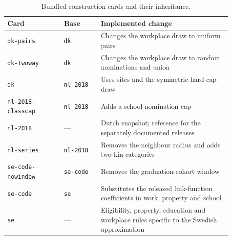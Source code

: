 \begin{table}[!htbp]
\centering\small
\caption{Bundled construction cards and their inheritance.}
\label{tab:cards}
\begin{tabular}{@{} >{\raggedright\arraybackslash}p{0.23\linewidth} >{\raggedright\arraybackslash}p{0.15\linewidth} >{\raggedright\arraybackslash}p{0.53\linewidth} @{}}
\toprule
\rowcolor{tableblue} \textbf{Card} & \textbf{Base} & \textbf{Implemented change} \\
\midrule
\texttt{dk-pairs} & \texttt{dk} & Changes the workplace draw to uniform pairs \\
\texttt{dk-twoway} & \texttt{dk} & Changes the workplace draw to random nominations and union \\
\texttt{dk} & \texttt{nl-2018} & Uses sites and the symmetric hard-cap draw \\
\texttt{nl-2018-classcap} & \texttt{nl-2018} & Adds a school nomination cap \\
\texttt{nl-2018} & --- & 2018 Dutch snapshot; reference for the separately documented releases \\
\texttt{nl-series} & \texttt{nl-2018} & Removes the neighbour radius and adds two kin categories \\
\texttt{se-code-nowindow} & \texttt{se-code} & Removes the graduation-cohort window \\
\texttt{se-code} & \texttt{se} & Substitutes the released link-function coefficients in work, property and school \\
\texttt{se} & --- & Eligibility, property, education and workplace rules specific to the Swedish approximation \\
\bottomrule
\end{tabular}
\end{table}
